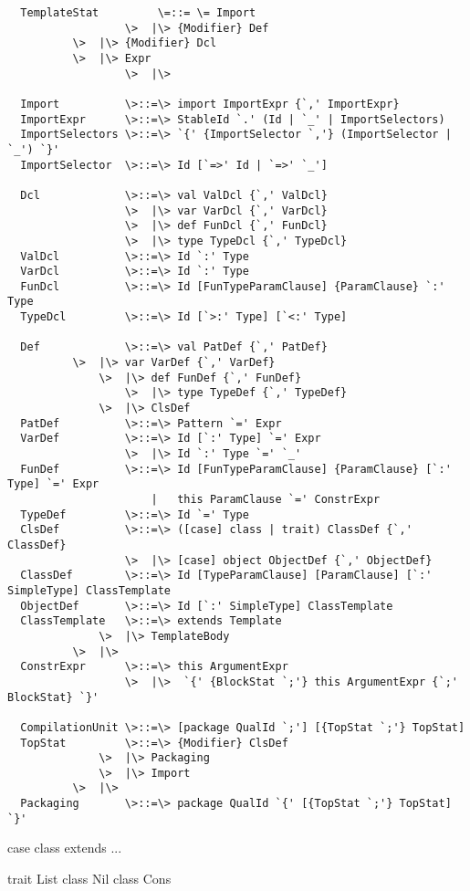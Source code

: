 \documentclass[11pt]{report}
\begin{document}
\begin{verbatim}
  TemplateStat         \=::= \= Import
                  \>  |\> {Modifier} Def
		  \>  |\> {Modifier} Dcl
		  \>  |\> Expr
                  \>  |\>

  Import          \>::=\> import ImportExpr {`,' ImportExpr}
  ImportExpr      \>::=\> StableId `.' (Id | `_' | ImportSelectors)
  ImportSelectors \>::=\> `{' {ImportSelector `,'} (ImportSelector | `_') `}'
  ImportSelector  \>::=\> Id [`=>' Id | `=>' `_']

  Dcl             \>::=\> val ValDcl {`,' ValDcl}
                  \>  |\> var VarDcl {`,' VarDcl}
                  \>  |\> def FunDcl {`,' FunDcl}
                  \>  |\> type TypeDcl {`,' TypeDcl}
  ValDcl          \>::=\> Id `:' Type
  VarDcl          \>::=\> Id `:' Type
  FunDcl          \>::=\> Id [FunTypeParamClause] {ParamClause} `:' Type
  TypeDcl         \>::=\> Id [`>:' Type] [`<:' Type]

  Def             \>::=\> val PatDef {`,' PatDef}
		  \>  |\> var VarDef {`,' VarDef}
  	          \>  |\> def FunDef {`,' FunDef}
                  \>  |\> type TypeDef {`,' TypeDef}
	          \>  |\> ClsDef
  PatDef          \>::=\> Pattern `=' Expr
  VarDef          \>::=\> Id [`:' Type] `=' Expr
                  \>  |\> Id `:' Type `=' `_'
  FunDef          \>::=\> Id [FunTypeParamClause] {ParamClause} [`:' Type] `=' Expr
                      |   this ParamClause `=' ConstrExpr
  TypeDef         \>::=\> Id `=' Type
  ClsDef          \>::=\> ([case] class | trait) ClassDef {`,' ClassDef}
                  \>  |\> [case] object ObjectDef {`,' ObjectDef}
  ClassDef        \>::=\> Id [TypeParamClause] [ParamClause] [`:' SimpleType] ClassTemplate
  ObjectDef       \>::=\> Id [`:' SimpleType] ClassTemplate
  ClassTemplate   \>::=\> extends Template
	          \>  |\> TemplateBody
		  \>  |\>
  ConstrExpr      \>::=\> this ArgumentExpr
                  \>  |\>  `{' {BlockStat `;'} this ArgumentExpr {`;' BlockStat} `}'

  CompilationUnit \>::=\> [package QualId `;'] [{TopStat `;'} TopStat]
  TopStat         \>::=\> {Modifier} ClsDef
	          \>  |\> Packaging
	          \>  |\> Import
		  \>  |\>
  Packaging       \>::=\> package QualId `{' [{TopStat `;'} TopStat] `}'
\end{verbatim}

case class extends { ... }

trait List { }
class Nil
class Cons

\end{document}
